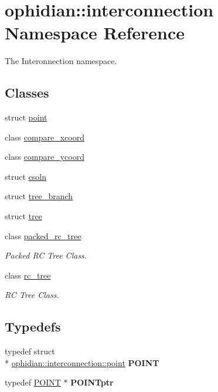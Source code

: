 \hypertarget{namespaceophidian_1_1interconnection}{\section{ophidian\-:\-:interconnection Namespace Reference}
\label{namespaceophidian_1_1interconnection}
}


The Interonnection namespace.  


\subsection*{Classes}
\begin{DoxyCompactItemize}
\item 
struct \hyperlink{structophidian_1_1interconnection_1_1point}{point}
\item 
class \hyperlink{classophidian_1_1interconnection_1_1compare__xcoord}{compare\-\_\-xcoord}
\item 
class \hyperlink{classophidian_1_1interconnection_1_1compare__ycoord}{compare\-\_\-ycoord}
\item 
struct \hyperlink{structophidian_1_1interconnection_1_1csoln}{csoln}
\item 
struct \hyperlink{structophidian_1_1interconnection_1_1tree__branch}{tree\-\_\-branch}
\item 
struct \hyperlink{structophidian_1_1interconnection_1_1tree}{tree}
\item 
class \hyperlink{classophidian_1_1interconnection_1_1packed__rc__tree}{packed\-\_\-rc\-\_\-tree}
\begin{DoxyCompactList}\small\item\em Packed R\-C Tree Class. \end{DoxyCompactList}\item 
class \hyperlink{classophidian_1_1interconnection_1_1rc__tree}{rc\-\_\-tree}
\begin{DoxyCompactList}\small\item\em R\-C Tree Class. \end{DoxyCompactList}\end{DoxyCompactItemize}
\subsection*{Typedefs}
\begin{DoxyCompactItemize}
\item 
\hypertarget{namespaceophidian_1_1interconnection_ad558fdd6517bc1cadbf768a98b094598}{typedef struct \\*
\hyperlink{structophidian_1_1interconnection_1_1point}{ophidian\-::interconnection\-::point} {\bfseries P\-O\-I\-N\-T}}\label{namespaceophidian_1_1interconnection_ad558fdd6517bc1cadbf768a98b094598}

\item 
\hypertarget{namespaceophidian_1_1interconnection_a7e3d7d79eaa5920376bd14bc1124b81e}{typedef \hyperlink{structophidian_1_1interconnection_1_1point}{P\-O\-I\-N\-T} $\ast$ {\bfseries P\-O\-I\-N\-Tptr}}\label{namespaceophidian_1_1interconnection_a7e3d7d79eaa5920376bd14bc1124b81e}

\end{DoxyCompactItemize}
